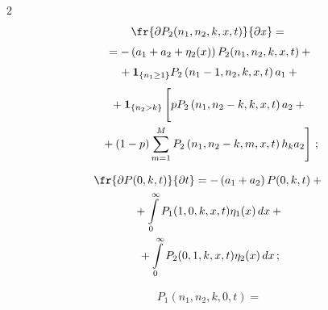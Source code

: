 \begin{multicols}{2}
\begin{multline}
\fr{\partial P_2(n_1,n_2,k,x,t)}{\partial x}={}\\[3pt]


{}=


-\left(a_1+a_2+\eta_2(x)\right)P_2(n_1,n_2,k,x,t)+{}\\[3pt]


{}+\mathbf{1}_{\{n_1\geq 1\}}P_2\left(n_1-1,n_2,k,x,t\right)a_1+{}\\[3pt]


{}+\mathbf{1}_{\{n_2>k\}}\left[


\vphantom{\sum\limits_{m=1}^{M}}


pP_2\left(n_1,n_2-k,k,x,t\right)a_2+{}\right.\\


\left.{}+(1-p)\sum\limits_{m=1}^{M}


P_2\left(n_1,n_2-k,m,x,t\right)h_k a_2\right]\,;


\label{after2}


\end{multline}





\vspace*{-12pt}





\noindent


\begin{multline}


\fr{\partial P(0,k,t)}{\partial t}=


-\left(a_1+a_2\right)P(0,k,t)+{}\\


{}+\int\limits_0^{\infty}P_1(1,0,k,x,t)\eta_1(x)\,dx+{}\\


{}+\int\limits_0^{\infty}P_2(0,1,k,x,t)\eta_2(x)\,dx\,;


\label{after3}


\end{multline}










\noindent


\begin{multline}


P_1\left(n_1,n_2,k,0,t\right)={}\\



\end{multline}
\end{multicols}
